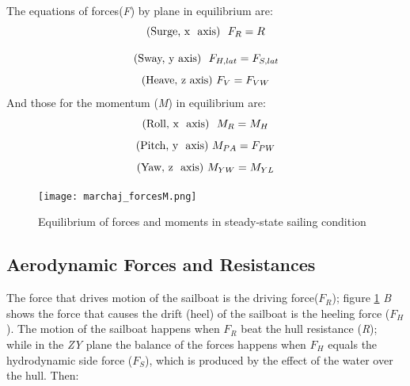 
The equations of forces(\textit{F}) by plane in equilibrium are:
\begin{equation}\label{eq:force_x}
    \text{(Surge, x  \space axis)  \space} F_{R}=R \\
\end{equation}

\begin{equation}\label{eq:force_y}
    \text{(Sway, y\space axis) \space } \space F_{H,lat}=F_{S,lat}\\
\end{equation}
\begin{equation}\label{eq:force_z}
    \text{(Heave, z\space axis)  } \space F_{V}=F_{VW}
\end{equation}
And those for the momentum (\textit{M}) in equilibrium are:
\begin{equation}\label{eq:m_x}
    \text{(Roll, x  \space axis) \space } M_{R}=M_{H} \\
\end{equation}
\begin{equation}\label{eq:m_y}
    \text{(Pitch, y \space axis)  } \space M_{PA}=F_{PW}\\
\end{equation}
\begin{equation}\label{eq:m_z}
    \text{(Yaw, z \space axis)  } \space M_{YW}=M_{YL}
\end{equation}

 \begin{figure}[ht]
\centering
  \texttt{[image: marchaj\_forcesM.png]}
 \caption{Equilibrium of forces and moments in steady-state sailing condition \cite{marchajaereo1979} }
\label{forces_m}
\end{figure}

\subsection{Aerodynamic Forces and Resistances} \label{sec:aero_forces}
The force that drives motion of the sailboat is the driving force($F_{R}$); figure \ref{forces_m} \textit{B}  shows the force that causes the drift (heel) of the sailboat is the heeling force ($F_{H}$). The motion of the sailboat happens when $F_{R}$ beat the hull resistance (\textit{R}); while in the \textit{ZY} plane the balance of the forces happens when $F_{H}$ equals the hydrodynamic side force ($F_{S}$), which is produced by the effect of the water over the hull. Then:\par 
{}

